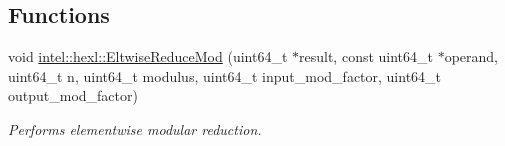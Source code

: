 \subsection*{Functions}
\begin{DoxyCompactItemize}
\item 
void \hyperlink{namespaceintel_1_1hexl_af3ddae165283841d495a322275baf5ee}{intel\+::hexl\+::\+Eltwise\+Reduce\+Mod} (uint64\+\_\+t $\ast$result, const uint64\+\_\+t $\ast$operand, uint64\+\_\+t n, uint64\+\_\+t modulus, uint64\+\_\+t input\+\_\+mod\+\_\+factor, uint64\+\_\+t output\+\_\+mod\+\_\+factor)
\begin{DoxyCompactList}\small\item\em Performs elementwise modular reduction. \end{DoxyCompactList}\end{DoxyCompactItemize}
